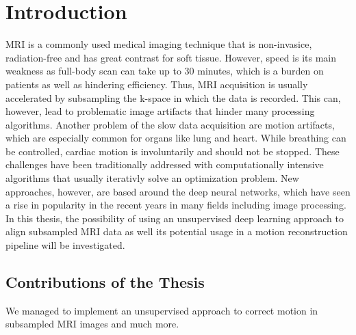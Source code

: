 \documentclass[english,version-2022-01]{uzl-thesis} %
\begin{document}

\chapter{Introduction} \label{Ch:Introduction}
MRI is a commonly used medical imaging technique that is non-invasice, radiation-free and has great contrast for soft tissue. However, speed is its main weakness as full-body scan can take up to 30 minutes, which is a burden on patients as well as hindering efficiency. Thus, MRI acquisition is usually accelerated by subsampling the k-space in which the data is recorded. This can, however, lead to problematic image artifacts that hinder many processing algorithms. Another problem of the slow data acquisition are motion artifacts, which are especially common for organs like lung and heart. While breathing can be controlled, cardiac motion is involuntarily and should not be stopped. These challenges have been traditionally addressed with computationally intensive algorithms that usually iterativly solve an optimization problem. New approaches, however, are based around the deep neural networks, which have seen a rise in popularity in the recent years in many fields including image processing. In this thesis, the possibility of using an unsupervised deep learning approach to align subsampled MRI data as well its potential usage in a motion reconstruction pipeline will be investigated.

\section{Contributions of the Thesis} \label{Sec:Contributions}
We managed to implement an unsupervised approach to correct motion in subsampled MRI images and much more. 
\end{document}
